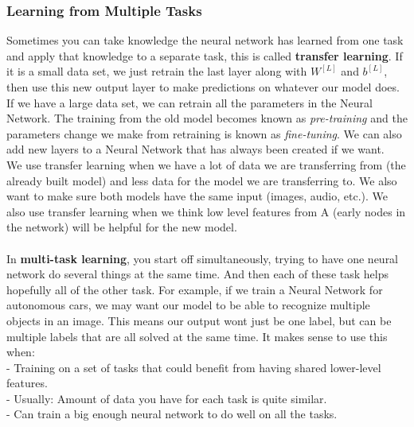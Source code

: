 \documentclass[11pt, a4paper]{article}
\begin{document}
\begin{spacing}{1.1}
	\subsubsection{Learning from Multiple Tasks}
	Sometimes you can take knowledge the neural network has learned from one task and apply that knowledge to a separate task, this is called \textbf{transfer learning}. If it is a small data set, we just retrain the last layer along with $W^{[L]}$ and $b^{[L]}$, then use this new output layer to make predictions on whatever our model does. If we have a large data set, we can retrain all the parameters in the Neural Network. The training from the old model becomes known as \textit{pre-training} and the parameters change we make from retraining is known as \textit{fine-tuning}. We can also add new layers to a Neural Network that has always been created if we want. \vspace*{1.5mm}\\ 
	We use transfer learning when we have a lot of data we are transferring from (the already built model) and less data for the model we are transferring to. We also want to make sure both models have the same input (images, audio, etc.). We also use transfer learning when we think low level features from A (early nodes in the network) will be helpful for the new model. \\~\\
	In \textbf{multi-task learning}, you start off simultaneously, trying to have one neural network do several things at the same time. And then each of these task helps hopefully all of the other task. For example, if we train a Neural Network for autonomous cars, we may want our model to be able to recognize multiple objects in an image. This means our output wont just be one label, but can be multiple labels that are all solved at the same time. It makes sense to use this when: \vspace*{.5mm} \\
	\hspace*{3mm} - Training on a set of tasks that could benefit from having shared lower-level features. \\
	\hspace*{3mm} - Usually: Amount of data you have for each task is quite similar. \\
	\hspace*{3mm} - Can train a big enough neural network to do well on all the tasks.
	
	

\end{spacing}
\end{document}
